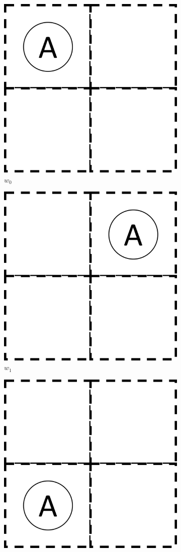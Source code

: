 \begin{figure}
    \centering
    \begin{subfigure}[b]{0.45\linewidth}
        \centering
        \includegraphics[width=0.5\linewidth]{2MathematicalFramework/InitialFramework/Images/2x2_no_walls_world_states/w0.png}
        \caption{$w_{0}$}
        \vspace{0.25cm}
    \end{subfigure}
    \begin{subfigure}[b]{0.45\linewidth}
        \centering
        \includegraphics[width=0.5\linewidth]{2MathematicalFramework/InitialFramework/Images/2x2_no_walls_world_states/w1.png}
        \caption{$w_{1}$}
        \vspace{0.25cm}
    \end{subfigure}
    \begin{subfigure}[b]{0.45\linewidth}
        \centering
        \includegraphics[width=0.5\linewidth]{2MathematicalFramework/InitialFramework/Images/2x2_no_walls_world_states/w2.png}

\end{subfigure}
\end{figure}

